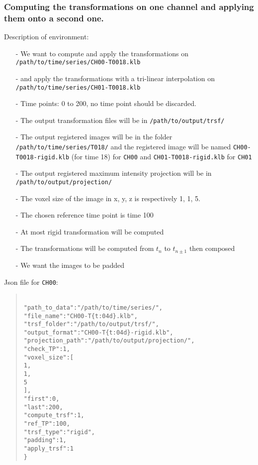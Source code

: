 \documentclass[10pt,a4paper]{book}
\newcommand\tab[1][.6cm]{\hspace*{#1}}
\newenvironment{code}[1]{\mbox{}\\[1ex]\hspace*{-#1cm}\begin{minipage}{150mm}\begin{quote}\tt}{\end{quote}\end{minipage}\mbox{}\\[1ex]}
\begin{document}
\subsubsection{Computing the transformations on one channel and applying them onto a second one.}
Description of environment:
\begin{itemize}
\item[-] We want to compute and apply the transformations on \texttt{/path/to/time/series/CH00-T0018.klb}
\item[-] and apply the transformations with a tri-linear interpolation on \texttt{/path/to/time/series/CH01-T0018.klb}
\item[-] Time points: 0 to 200, no time point should be discarded.
\item[-] The output transformation files will be in \texttt{/path/to/output/trsf/}
\item[-] The output registered images will be in the folder \texttt{/path/to/time/series/T018/} and the registered image will be named \texttt{CH00-T0018-rigid.klb} (for time 18) for \texttt{CH00} and \texttt{CH01-T0018-rigid.klb} for \texttt{CH01}
\item[-] The output registered maximum intensity projection will be in \texttt{/path/to/output/projection/}
\item[-] The voxel size of the image in x, y, z is respectively 1, 1, 5.
\item[-] The chosen reference time point is time 100
\item[-] At most rigid transformation will be computed
\item[-] The transformations will be computed from $t_n$ to $t_{n\pm 1}$ then composed
\item[-] We want the images to be padded
\end{itemize}
Json file for \texttt{CH00}:
\begin{code}{0.8}
\{\\
\tab"path\_to\_data":"/path/to/time/series/",\\
\tab"file\_name":"CH00-T\{t:04d\}.klb",\\
\tab"trsf\_folder":"/path/to/output/trsf/",\\
\tab"output\_format":"CH00-T\{t:04d\}-rigid.klb",\\
\tab"projection\_path":"/path/to/output/projection/",\\
\tab"check\_TP":1,\\
\tab"voxel\_size":[\\
\tab\tab1,\\
\tab\tab1,\\
\tab\tab5\\
\tab],\\
\tab"first":0,\\
\tab"last":200,\\
\tab"compute\_trsf":1,\\
\tab"ref\_TP":100,\\
\tab"trsf\_type":"rigid",\\
\tab"padding":1,\\
\tab"apply\_trsf":1\\
\}
\end{code}
\end{document}
